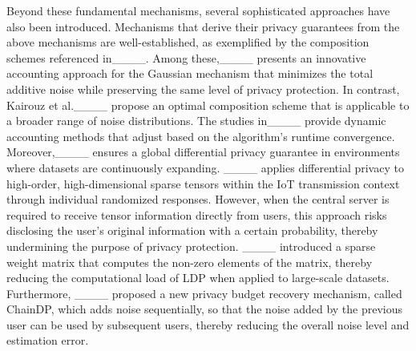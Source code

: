 Beyond these fundamental mechanisms, several sophisticated approaches have also been introduced.
Mechanisms that derive their privacy guarantees from the above mechanisms are well-established, as exemplified by the composition schemes referenced in____. Among these,____ presents an innovative accounting approach for the Gaussian mechanism that minimizes the total additive noise while preserving the same level of privacy protection. In contrast, Kairouz et al.____ propose an optimal composition scheme that is applicable to a broader range of noise distributions. The studies in____ provide dynamic accounting methods that adjust based on the algorithm's runtime convergence. Moreover,____ ensures a global differential privacy guarantee in environments where datasets are continuously expanding.
____ applies differential privacy to high-order, high-dimensional sparse tensors within the IoT transmission context through individual randomized responses. However, when the central server is required to receive tensor information directly from users, this approach risks disclosing the user's original information with a certain probability, thereby undermining the purpose of privacy protection.
____ introduced a sparse weight matrix that computes the non-zero elements of the matrix, thereby reducing the computational load of LDP when applied to large-scale datasets.
Furthermore, ____ proposed a new privacy budget recovery mechanism, called ChainDP, which adds noise sequentially, so that the noise added by the previous user can be used by subsequent users, thereby reducing the overall noise level and estimation error.
